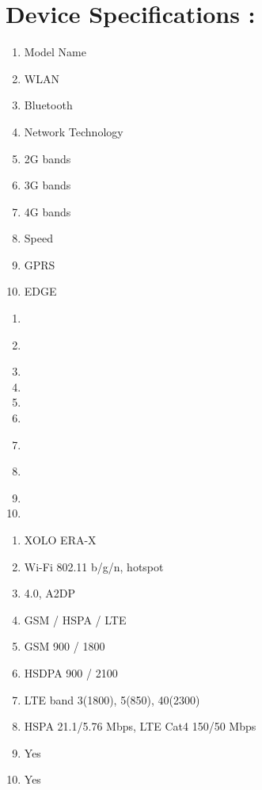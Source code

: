 \documentclass{article}
\begin{document}
\part{\LARGE Device Specifications :}
\setlength{\columnsep}{0pt}
\begin{multicols}{3}
\begin{enumerate}[label= ]
\item Model Name
\item WLAN\\
\item Bluetooth
\item Network 	Technology
\item 2G bands
\item 3G bands
\item 4G bands\\
\item Speed\\
\item GPRS
\item EDGE
\end{enumerate}
\columnbreak
\begin{enumerate}[label= ]
\item \textrightarrow
\item \textrightarrow\\
\item \textrightarrow
\item \textrightarrow
\item \textrightarrow
\item \textrightarrow
\item \textrightarrow\\
\item \textrightarrow\\
\item \textrightarrow
\item \textrightarrow
\end{enumerate}
\columnbreak
\begin{enumerate}[label= ]
\item XOLO ERA-X
\item Wi-Fi 802.11 b/g/n, hotspot
\item 4.0, A2DP
\item GSM / HSPA / LTE
\item GSM 900 / 1800 
\item HSDPA 900 / 2100 
\item LTE band 3(1800), 5(850), 40(2300)
\item HSPA 21.1/5.76 Mbps, LTE Cat4 150/50 Mbps
\item Yes
\item Yes
\end{enumerate}
\end{multicols}
\vspace{0.02\textheight}
\end{document}
